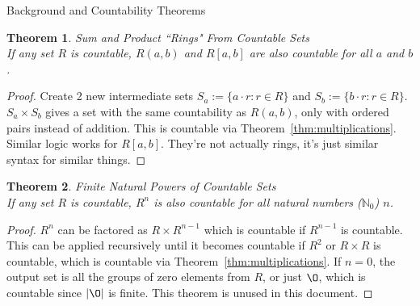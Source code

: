 \documentclass[12pt]{article}
\newtheorem{thm}{Theorem}
\begin{document}
\begin{section}{Background and Countability Theorems}
	\begin{thm}\label{thm:rings}
		\emph{Sum and Product ``Rings" From Countable Sets}\\
		\indent\emph{If any set $R$ is countable, $R(a, b)$ and $R[a, b]$ are also countable
		for all $a$ and $b$.}
	\end{thm}\begin{proof}
		Create 2 new intermediate sets $S_a := \{a\cdot r:r\in R\}$ and $S_b := \{b\cdot r:r\in R\}$.
		$S_a\times S_b$ gives a set with the same countability as $R(a,b)$, only with
		ordered pairs instead of addition. This is countable via Theorem~\ref{thm:multiplications}.
		Similar logic works for $R[a,b]$. They're not actually rings, it's just similar syntax for
		similar things.
	\end{proof}

	\begin{thm}\label{thm:powers}
		\emph{Finite Natural Powers of Countable Sets}\\
		\indent\emph{If any set $R$ is countable, $R^n$ is also countable for all natural
		numbers ($\mathbb N_0$) $n$.}
	\end{thm}\begin{proof}
		$R^n$ can be factored as $R\times R^{n-1}$ which is countable if $R^{n-1}$ is countable. This can be applied recursively until it becomes countable if $R^2$ or $R\times R$ is
		countable, which is countable via Theorem~\ref{thm:multiplications}. If $n=0$, the
		output set is all the groups of zero elements from $R$, or just $\O$, which is countable
		since $\left|\O\right|$ is finite. This theorem is unused in this document.
	\end{proof}


\end{section}
\end{document}
